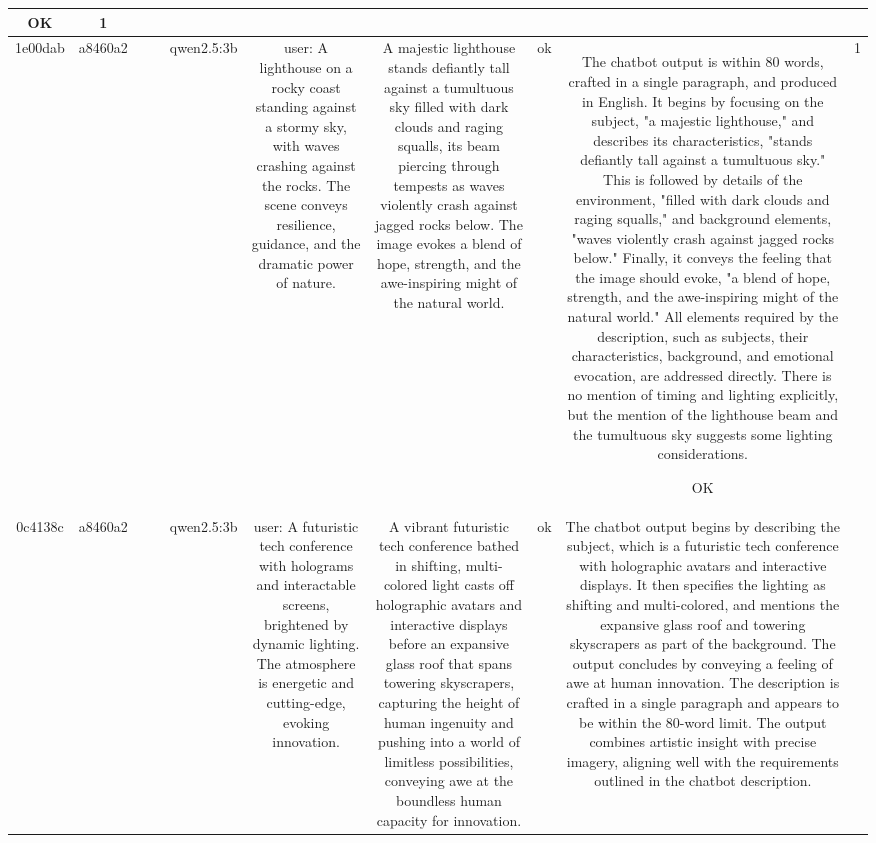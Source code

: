\begin{table}[h!]
\begin{tabular}{|c|c|c|c|c|c|c|c|c|c|}
OK & 1\\
\hline
1e00dab & a8460a2 &  &  & qwen2.5:3b & user: A lighthouse on a rocky coast standing against a stormy sky, with waves crashing against the rocks. The scene conveys resilience, guidance, and the dramatic power of nature. & A majestic lighthouse stands defiantly tall against a tumultuous sky filled with dark clouds and raging squalls, its beam piercing through tempests as waves violently crash against jagged rocks below. The image evokes a blend of hope, strength, and the awe-inspiring might of the natural world. & ok & The chatbot output is within 80 words, crafted in a single paragraph, and produced in English. It begins by focusing on the subject, "a majestic lighthouse," and describes its characteristics, "stands defiantly tall against a tumultuous sky." This is followed by details of the environment, "filled with dark clouds and raging squalls," and background elements, "waves violently crash against jagged rocks below." Finally, it conveys the feeling that the image should evoke, "a blend of hope, strength, and the awe-inspiring might of the natural world." All elements required by the description, such as subjects, their characteristics, background, and emotional evocation, are addressed directly. There is no mention of timing and lighting explicitly, but the mention of the lighthouse beam and the tumultuous sky suggests some lighting considerations. 

OK & 1\\
\hline
0c4138c & a8460a2 &  &  & qwen2.5:3b & user: A futuristic tech conference with holograms and interactable screens, brightened by dynamic lighting. The atmosphere is energetic and cutting-edge, evoking innovation. & A vibrant futuristic tech conference bathed in shifting, multi-colored light casts off holographic avatars and interactive displays before an expansive glass roof that spans towering skyscrapers, capturing the height of human ingenuity and pushing into a world of limitless possibilities, conveying awe at the boundless human capacity for innovation. & ok & The chatbot output begins by describing the subject, which is a futuristic tech conference with holographic avatars and interactive displays. It then specifies the lighting as shifting and multi-colored, and mentions the expansive glass roof and towering skyscrapers as part of the background. The output concludes by conveying a feeling of awe at human innovation. The description is crafted in a single paragraph and appears to be within the 80-word limit. The output combines artistic insight with precise imagery, aligning well with the requirements outlined in the chatbot description.


\end{tabular}
\end{table}
